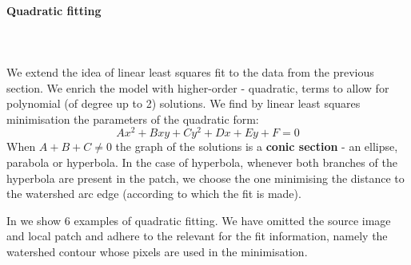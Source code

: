 \paragraph{Quadratic fitting}\mbox{}\\\mbox{}\\
We extend the idea of linear least squares fit to the data from the previous section. We enrich %
the model with higher-order - quadratic, terms to allow for polynomial (of degree up to 2) solutions. We find by linear least squares minimisation the parameters of the quadratic form: %
\[
 Ax^2+Bxy+Cy^2+Dx+Ey+F=0
\]
When $A + B + C \ne 0$ the graph of the solutions is a \textbf{conic section} - an ellipse, parabola or hyperbola. In the case of hyperbola, whenever both branches of the hyperbola are present in the patch, we choose the one minimising the distance to the watershed arc edge (according to which the fit is made).

In  we show 6 examples of quadratic fitting. We have omitted the source image %
and local patch and adhere to %
the relevant for the fit information, namely the watershed contour whose pixels are used in the minimisation.

